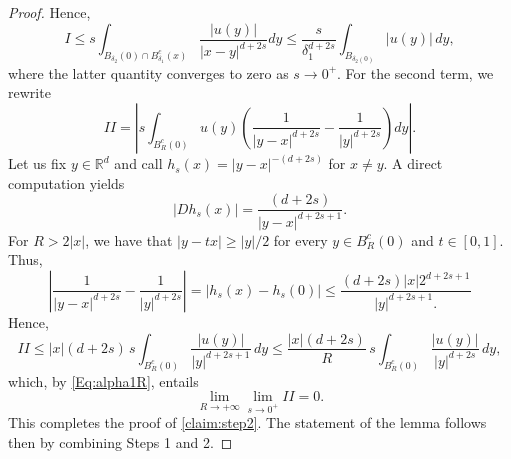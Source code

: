 \documentclass[10pt,a4paper]{amsart}
\def\R{\mathbb{R}}
\newcommand{\abs}[1]{\left|#1\right|}
\begin{document}
\begin{proof}
    Hence,
    \begin{equation*}
       I\leq s\int_{B_{\delta_2}(0)\cap B_{\delta_1}^c(x)}\frac{\abs{u(y)}}{\abs{x-y}^{d+2s}}dy \leq \frac{s}{\delta_1^{d+2s}}\int_{B_{\delta_2(0)}}\abs{u(y)}\,dy,
    \end{equation*}
    where the latter quantity converges to zero as $s\to 0^+$.
    For the second term, we rewrite
    \begin{equation*}
        II=\left|s\int_{B_R^c(0)}u(y)\left(\frac{1}{\abs{y-x}^{d+2s}}-\frac{1}{\abs{y}^{d+2s}}\right)dy\right|.
    \end{equation*}
    Let us fix $y\in \R^d$ and call $h_s(x)=\abs{y-x}^{-(d+2s)}$ for $x\neq y$. A direct computation yields
    \begin{equation*}
        \abs{Dh_s(x)}=\frac{(d+2s)}{\abs{y-x}^{d+2s+1}}.
    \end{equation*}
    For $R>2|x|$, we have that $\abs{y-tx}\geq\abs{y}/2$ for every $y\in B_R^c(0)$ and $t\in [0,1]$. Thus,
    \begin{equation*}
        \abs{\frac{1}{\abs{y-x}^{d+2s}}-\frac{1}{\abs{y}^{d+2s}}}=\abs{h_s(x)-h_s(0)}\leq \frac{(d+2s)\abs{x}2^{d+2s+1}}{\abs{y}^{d+2s+1}.}
    \end{equation*}
    Hence,
    \begin{equation}
    \label{eq:estimateII}
        II\leq \abs{x}(d+2s)\,s\int_{B^c_R(0)}\frac{|u(y)|}{\abs{y}^{d+2s+1}}\,dy\leq \frac{\abs{x}(d+2s)}{R}\,s\int_{B_R^c(0)}\frac{|u(y)|}{\abs{y}^{d+2s}}\,dy,
    \end{equation}
    which, by \eqref{Eq:alpha1R}, entails
    \begin{equation*}
        \lim_{R\to+\infty}\lim_{s\to 0^+}II=0.
    \end{equation*}
    This completes the proof of \eqref{claim:step2}. The statement of the lemma follows then by combining Steps 1 and 2.
\end{proof}
\end{document}
